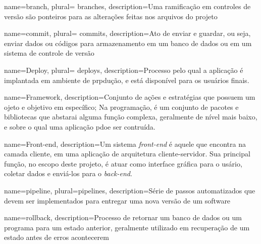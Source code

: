



    
    

 {
    name=branch,
    plural= {branches},
    description={Uma ramificação em controles de versão são ponteiros para as alterações feitas nos arquivos do projeto}
}        

 {
    name=commit,
    plural= {commits},
    description={Ato de enviar e guardar, ou seja, enviar dados ou códigos para armazenamento em um banco de dados ou em um sistema de controle de versão}
}    
    
 {
    name=Deploy,
    plural= {deploys},
    description={Processo pelo qual a aplicação é implantada em ambiente
  de prpdução, e está disponível para os usuários finais.}
}

 {
    name=Framework,
    description={Conjunto de ações e estratégias que possuem um ojeto e objetivo em específico;
    Na programação, é um conjunto de pacotes e bibliotecas que abstarai
    alguma função complexa, geralmente de nível mais baixo, e sobre o
    qual uma aplicação pdoe ser contruída.}
}

 {
    name={Front-end},
    description={Um sistema \emph{front-end} é aquele que encontra na
    camada cliente, em uma aplicação de arquitetura cliente-servidor. Sua
    principal função, no escopo deste projeto, é atuar como interface
    gráfica para o usário, coletar dados e enviá-los para o \emph{back-end}.}
}    

 {
    name={pipeline},
    plural={pipelines},
    description={Série de passos automatizados que devem ser implementados para entregar uma nova versão de um software}
}


 {
    name={rollback},
    description={Processo de retornar um banco de dados ou um programa para um estado anterior, geralmente utilizado em recuperação de um estado antes de erros acontecerem}
}
                
